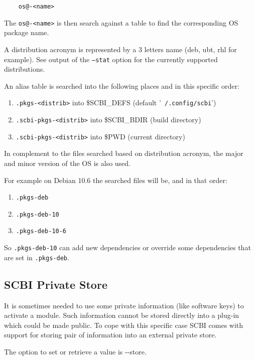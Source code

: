 \documentclass[a4paper,12pt,twoside]{article}
\newcommand{\code}[1]{\texttt{#1}}
\newcommand{\file}[1]{'{\texttt{#1}}'}
\newcommand{\ddash}{-{}-}
\begin{document}
\begin{lstlisting}
	os@-<name>
\end{lstlisting}

The \code{os@-<name>} is then search against a table to find the corresponding OS package name.

A distribution acronym is represented by a 3 letters name (deb, ubt, rhl for example). See output of the \code{--stat} option for the currently supported distributions.

An alias table is searched into the following places and in this specific order:

\begin{enumerate}
	\item \code{.pkgs-<distrib>} into \$SCBI\_DEFS (default \file{~/.config/scbi})
	\item \code{.scbi-pkgs-<distrib>} into \$SCBI\_BDIR (build directory)
	\item \code{.scbi-pkgs-<distrib>} into \$PWD (current directory)
\end{enumerate}

In complement to the files searched based on distribution acronym, the major and minor version of the OS is also used.

For example on Debian 10.6 the searched files will be, and in that order:

\begin{enumerate}
	\item \code{.pkgs-deb}
	\item \code{.pkgs-deb-10}
	\item \code{.pkgs-deb-10-6}
\end{enumerate}

So \code{.pkgs-deb-10} can add new dependencies or override some dependencies that are set in \code{.pkgs-deb}.

\subsection{SCBI Private Store}
\label{private store}
\label{store}

It is sometimes needed to use some private information (like software keys) to activate a module. Such information cannot be stored directly into a plug-in which could be made public. To cope with this specific case SCBI comes with support for storing pair of information into an external private store.

The option to set or retrieve a value is \ddash{}store.
\end{document}
